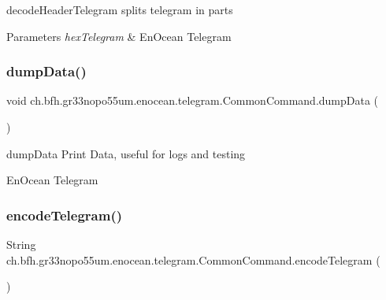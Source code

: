 decode\+Header\+Telegram splits telegram in parts


\begin{DoxyParams}{Parameters}
{\em hex\+Telegram} & En\+Ocean Telegram \\
\hline
\end{DoxyParams}
\hypertarget{classch_1_1bfh_1_1gr33nopo55um_1_1enocean_1_1telegram_1_1_common_command_a11403f33c18056309c71e2c3ff9e3e4a}{}\label{classch_1_1bfh_1_1gr33nopo55um_1_1enocean_1_1telegram_1_1_common_command_a11403f33c18056309c71e2c3ff9e3e4a} 
\subsubsection{\texorpdfstring{dump\+Data()}{dumpData()}}
{\footnotesize\ttfamily void ch.\+bfh.\+gr33nopo55um.\+enocean.\+telegram.\+Common\+Command.\+dump\+Data (\begin{DoxyParamCaption}{ }\end{DoxyParamCaption})}

dump\+Data Print Data, useful for logs and testing 

En\+Ocean Telegram \hypertarget{classch_1_1bfh_1_1gr33nopo55um_1_1enocean_1_1telegram_1_1_common_command_aa18085a594f76c4b1f347a1e4802d6e8}{}\label{classch_1_1bfh_1_1gr33nopo55um_1_1enocean_1_1telegram_1_1_common_command_aa18085a594f76c4b1f347a1e4802d6e8} 
\subsubsection{\texorpdfstring{encode\+Telegram()}{encodeTelegram()}}
{\footnotesize\ttfamily String ch.\+bfh.\+gr33nopo55um.\+enocean.\+telegram.\+Common\+Command.\+encode\+Telegram (\begin{DoxyParamCaption}{ }\end{DoxyParamCaption})}

